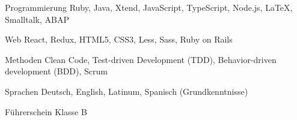

\begin{cvskills}

  \cvskill
    {Programmierung} %
    {Ruby, Java, Xtend, JavaScript, TypeScript, Node.js, \LaTeX, Smalltalk, ABAP} %

  \cvskill
    {Web} %
    {React, Redux, HTML5, CSS3, Less, Sass, Ruby on Rails} %


  \cvskill
    {Methoden} %
    {Clean Code, Test-driven Development (TDD), Behavior-driven development (BDD), Scrum} %

  \cvskill
    {Sprachen} %
    {Deutsch, English, Latinum, Spanisch (Grundkenntnisse)} %

  \cvskill
    {Führerschein} %
    {Klasse B} %

\end{cvskills}
